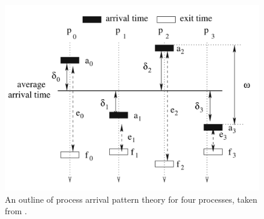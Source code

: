 \begin{figure}
    \centering
    \includegraphics[width=4.5in]{3_Chapters/2_Chapter_Background/Figs/pap_theory.png}
    \caption[Outline of process arrival patterns theory]{
        An outline of process arrival pattern theory for four processes, taken from \cite{Faraj2008StudyProcArrivalMPIColl}.
    }
    \label{fig:pap-theory}
\end{figure}
